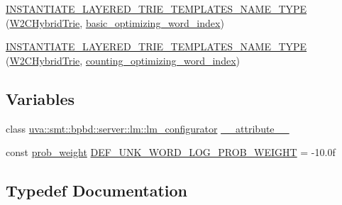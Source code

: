 \begin{DoxyCompactItemize}
\hyperlink{namespaceuva_1_1smt_1_1bpbd_1_1server_1_1lm_a7e1ab11b60a75813465799a5c1140da9}{I\+N\+S\+T\+A\+N\+T\+I\+A\+T\+E\+\_\+\+L\+A\+Y\+E\+R\+E\+D\+\_\+\+T\+R\+I\+E\+\_\+\+T\+E\+M\+P\+L\+A\+T\+E\+S\+\_\+\+N\+A\+M\+E\+\_\+\+T\+Y\+P\+E} (\hyperlink{classuva_1_1smt_1_1bpbd_1_1server_1_1lm_1_1_w2_c_hybrid_trie}{W2\+C\+Hybrid\+Trie}, \hyperlink{namespaceuva_1_1smt_1_1bpbd_1_1server_1_1lm_1_1dictionary_a3001583c904eec702b4a4125082a7ecd}{basic\+\_\+optimizing\+\_\+word\+\_\+index})
\item 
\hyperlink{namespaceuva_1_1smt_1_1bpbd_1_1server_1_1lm_aafd1ffb4ccc6c97ca373f027745f3257}{I\+N\+S\+T\+A\+N\+T\+I\+A\+T\+E\+\_\+\+L\+A\+Y\+E\+R\+E\+D\+\_\+\+T\+R\+I\+E\+\_\+\+T\+E\+M\+P\+L\+A\+T\+E\+S\+\_\+\+N\+A\+M\+E\+\_\+\+T\+Y\+P\+E} (\hyperlink{classuva_1_1smt_1_1bpbd_1_1server_1_1lm_1_1_w2_c_hybrid_trie}{W2\+C\+Hybrid\+Trie}, \hyperlink{namespaceuva_1_1smt_1_1bpbd_1_1server_1_1lm_1_1dictionary_a61cbd647b15de785ccf4cdd26661c366}{counting\+\_\+optimizing\+\_\+word\+\_\+index})
\end{DoxyCompactItemize}
\subsection*{Variables}
\begin{DoxyCompactItemize}
\item 
class \hyperlink{classuva_1_1smt_1_1bpbd_1_1server_1_1lm_1_1lm__configurator}{uva\+::smt\+::bpbd\+::server\+::lm\+::lm\+\_\+configurator} \hyperlink{namespaceuva_1_1smt_1_1bpbd_1_1server_1_1lm_a118bbc146a82483b1a6da28b43c5df06}{\+\_\+\+\_\+attribute\+\_\+\+\_\+}
\item 
const \hyperlink{namespaceuva_1_1smt_1_1bpbd_1_1server_a01e9ea4de9c226f4464862e84ff0bbcc}{prob\+\_\+weight} \hyperlink{namespaceuva_1_1smt_1_1bpbd_1_1server_1_1lm_a6de1c7e176aa41057187126069624cf7}{D\+E\+F\+\_\+\+U\+N\+K\+\_\+\+W\+O\+R\+D\+\_\+\+L\+O\+G\+\_\+\+P\+R\+O\+B\+\_\+\+W\+E\+I\+G\+H\+T} = -\/10.\+0f
\end{DoxyCompactItemize}


\subsection{Typedef Documentation}
\hypertarget{namespaceuva_1_1smt_1_1bpbd_1_1server_1_1lm_ace2f660bee1117b5b98b58eb5c8e853a}{}
